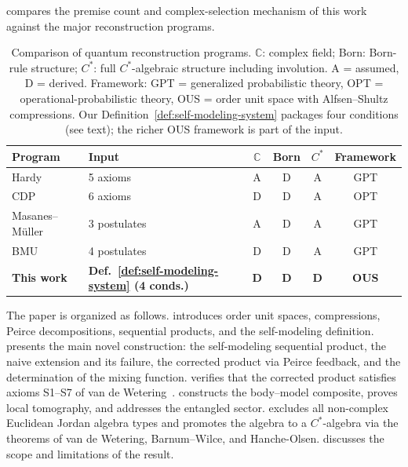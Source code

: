 \documentclass[11pt]{article}
\begin{document}
 compares the premise count and complex-selection
mechanism of this work against the major reconstruction programs.

\begin{table}[ht]
\centering
\caption{Comparison of quantum reconstruction programs.  $\mathbb{C}$:
complex field; Born: Born-rule structure; $C^{*}$: full
$C^{*}$-algebraic structure including involution.  A = assumed,
D = derived.  Framework: GPT = generalized probabilistic theory,
OPT = operational-probabilistic theory, OUS = order unit space with
Alfsen--Shultz compressions.  Our
Definition~\ref{def:self-modeling-system} packages four conditions
(see text); the richer OUS framework is part of the input.}
\label{tab:comparison}
\smallskip\small
\begin{tabular}{@{}llcccc@{}}
\toprule
Program & Input & $\mathbb{C}$ & Born & $C^{*}$ & Framework \\
\midrule
Hardy~\cite{Hardy2001} & 5 axioms & A & D & A & GPT \\
CDP~\cite{CDP2011} & 6 axioms & D & D & A & OPT \\
Masanes--M\"uller~\cite{MasanesMueller2013} & 3 postulates & A & D & A & GPT \\
BMU~\cite{BarnumMuellerUdudec2014} & 4 postulates & D & D & A & GPT \\
\textbf{This work} & \textbf{Def.~\ref{def:self-modeling-system} (4 conds.)} & \textbf{D} & \textbf{D} & \textbf{D} & \textbf{OUS} \\
\bottomrule
\end{tabular}
\end{table}



The paper is organized as follows.
 introduces order unit spaces, compressions, Peirce
decompositions, sequential products, and the self-modeling definition.
 presents the main novel construction: the self-modeling
sequential product, the naive extension and its failure, the corrected
product via Peirce feedback, and the determination of the mixing
function.
 verifies that the corrected product satisfies
axioms S1--S7 of van de Wetering~\cite{vandeWetering2019b}.
 constructs the body--model composite, proves
local tomography, and addresses the entangled sector.
 excludes all non-complex Euclidean Jordan algebra
types and promotes the algebra to a $C^{*}$-algebra via the theorems
of van de Wetering, Barnum--Wilce, and Hanche-Olsen.
 discusses the scope and limitations of the
result.
\end{document}
